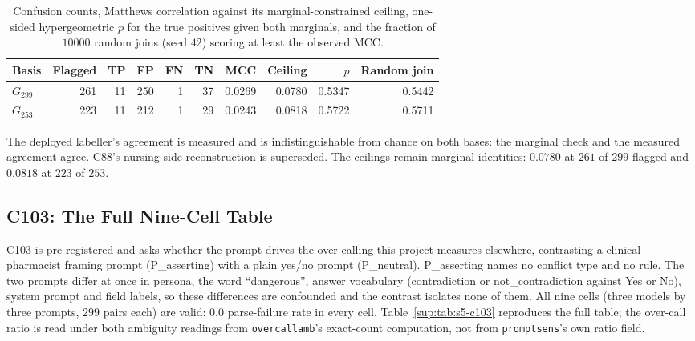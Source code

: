 \begin{table}[H]
\caption[C120, the deployed labeller on the exact join]{Confusion counts, Matthews correlation
against its marginal-constrained ceiling, one-sided hypergeometric $p$ for the true positives given
both marginals, and the fraction of $10000$ random joins (seed $42$) scoring at least the observed
MCC.}
\centering
\small
\begin{tabular}{lrrrrrrrrr}
\toprule
\textbf{Basis} & \textbf{Flagged} & \textbf{TP} & \textbf{FP} & \textbf{FN} & \textbf{TN} & \textbf{MCC} & \textbf{Ceiling} & \textbf{$p$} & \textbf{Random join} \\
\midrule
$G_{299}$ & 261 & 11 & 250 & 1 & 37 & 0.0269 & 0.0780 & 0.5347 & 0.5442 \\
$G_{253}$ & 223 & 11 & 212 & 1 & 29 & 0.0243 & 0.0818 & 0.5722 & 0.5711 \\
\bottomrule
\end{tabular}
\label{sup:tab:s5-c120}
\end{table}

The deployed labeller's agreement is measured and is indistinguishable from chance on both bases:
the marginal check and the measured agreement agree. C88's nursing-side reconstruction is
superseded. The ceilings remain marginal identities: $0.0780$ at $261$ of $299$ flagged and $0.0818$
at $223$ of $253$.

\subsection{C103: The Full Nine-Cell Table}
\label{sup:sec:s5-c103}

C103 is pre-registered and asks whether the prompt drives the over-calling this project measures
elsewhere, contrasting a clinical-pharmacist framing prompt (P\_asserting) with a plain yes/no
prompt (P\_neutral). P\_asserting names no conflict type and no rule. The two prompts differ at
once in persona, the word ``dangerous'', answer vocabulary (contradiction or not\_contradiction
against Yes or No), system prompt and field labels, so these differences are confounded and the
contrast isolates none of them. All nine cells (three models by three prompts,
$299$ pairs each) are valid: $0.0$ parse-failure rate in every cell.
Table~\ref{sup:tab:s5-c103} reproduces the full table; the over-call ratio is
read under both ambiguity readings from \texttt{overcallamb}'s exact-count
computation, not from \texttt{promptsens}'s own ratio field.

